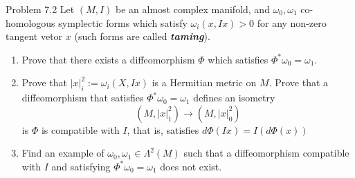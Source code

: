 \begin{thing5}{Problem 7.2}\leavevmode
	Let $(M,I)$ be an almost complex manifold, and $\omega_0,\omega_1$ co-homologous symplectic forms which satisfy $\omega_i(x,Ix)>0$ for any non-zero tangent vetor $x$ (such forms are called \textit{\textbf{taming}}).
	\begin{enumerate}[label=\alph*.]
	\item Prove that there exists a diffeomorphism $\Phi$ which satisfies $\Phi^*\omega_0=\omega_1$.
	\item Prove that $|x|^2_{i}:=\omega_i(X,Ix)$ is a Hermitian metric on $M$. Prove that a diffeomorphism that satisfies $\Phi^*\omega_0=\omega_1$ defines an isometry
		\[(M,|x|^2_1)\longrightarrow(M,|x|^2_0)\]
		is $\Phi$ is compatible with $I$, that is, satisfies $d\Phi(Ix)=I(d\Phi(x))$ \item Find an example of $\omega_0,\omega_1\in\Lambda^2(M)$ such that a diffeomorphism compatible with $I$ and satisfying $\Phi^*\omega_0=\omega_1$ does not exist.
	\end{enumerate}
\end{thing5}

